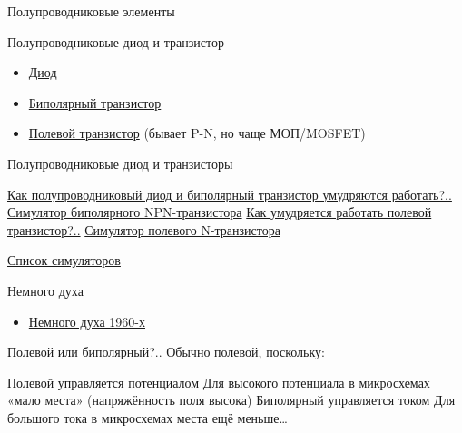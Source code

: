 \documentclass[xetex,aspectratio=43]{beamer}
\begin{document}
\begin{frame}{Полупроводниковые элементы}

\begin{block}{Полупроводниковые диод и транзистор}
\begin{itemize}
\item
  \href{https://en.wikipedia.org/wiki/Diode}{Диод}
\item
  \href{https://en.wikipedia.org/wiki/Bipolar_junction_transistor}{Биполярный
  транзистор}
\item \href{https://en.wikipedia.org/wiki/Field-effect_transistor}{Полевой транзистор} (бывает P-N, но чаще МОП/MOSFET)
\end{itemize}
\end{block}

\pause

\begin{block}{Полупроводниковые диод и транзисторы}
    \begin{outline}[itemize]
        \1 \href{\ytlink{OMGdSCaMVD0}}{Как полупроводниковый диод и биполярный транзистор умудряются работать?..}
            \2 \href{https://www.falstad.com/circuit/e-npn.html}{Симулятор биполярного NPN-транзистора}
        \1 \href{\ytlink{ZUly6Wz0RHc}}{Как умудряется работать полевой транзистор?..}
            \2 \href{https://www.falstad.com/circuit/e-nmosfet.html}{Симулятор полевого N-транзистора}
    \end{outline}
    \pause
    \href{https://www.falstad.com/circuit/e-index.html}{Список симуляторов}
\end{block}

\pause

\begin{block}{Немного духа}
    \begin{itemize}
        \item \href{\ytlink{DEewNHWgqFU}}{Немного духа 1960-х}
    \end{itemize}
\end{block}
\end{frame}

\begin{frame}{Полевой или биполярный?..}
    Обычно полевой, поскольку:
    \begin{outline}[itemize]
        \1 Полевой управляется потенциалом
            \2 Для высокого потенциала в микросхемах «мало места» (напряжённость поля высока)
        \pause
        \1 Биполярный управляется током
            \2 Для большого тока в микросхемах места ещё меньше\ldots
    \end{outline}
\end{frame}
\end{document}
